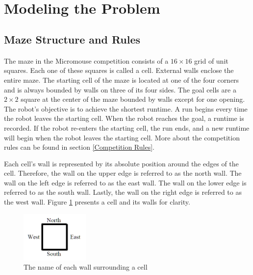 \documentclass[12pt]{article}
\begin{document}
\section{Modeling the Problem}
\subsection{Maze Structure and Rules}
\paragraph{}
The \gls{maze} in the \gls{Micromouse} competition consists of a $16 \times 16$ grid of unit squares.
Each one of these squares is called a \gls{cell}.
External walls enclose the entire \gls{maze}.
The starting \gls{cell} of the \gls{maze} is located at one of the four corners and is always bounded by walls on three of its four sides.
The goal \gls{cell}s are a $2 \times 2$ square at the center of the \gls{maze} bounded by walls except for one opening.
The robot's objective is to achieve the shortest runtime.
A run begins every time the robot leaves the starting \gls{cell}.
When the robot reaches the goal, a runtime is recorded.
If the robot re-enters the starting \gls{cell}, the run ends, and a new runtime will begin when the robot leaves the starting \gls{cell}.
More about the competition rules can be found in section \ref{Competition Rules}.

Each \gls{cell}'s wall is represented by its absolute position around the edges of the \gls{cell}.
Therefore, the wall on the upper edge is referred to as the north wall.
The wall on the left edge is referred to as the east wall.
The wall on the lower edge is referred to as the south wall.
Lastly, the wall on the right edge is referred to as the west wall.
Figure \ref{cell figure} presents a \gls{cell} and its walls for clarity.

\begin{figure}[H]
\centering
\includegraphics[width=0.3\textwidth]{images/cell_walls.png}
\caption{The name of each wall surrounding a \gls{cell}}
\label{cell figure}
\end{figure}
\end{document}
